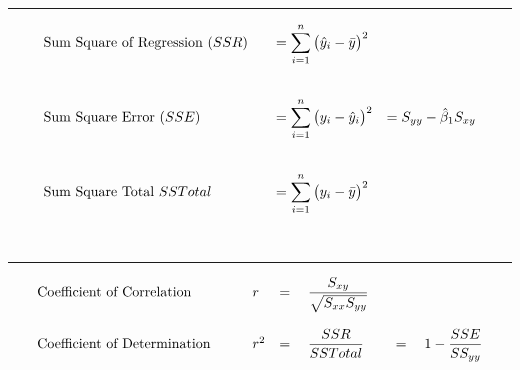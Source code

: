 \documentclass{article}
\newcommand{\HRuleLight}{\rule{\linewidth}{0.1mm}}
\begin{document}
\smallskip
\smallskip



\HRuleLight



\begin{equation*}
	\begin{array}{llll}
		\text{Sum Square of Regression }(SSR)\quad	& = \displaystyle \sum_{i=1}^{n} \big( \hat{y}_{i} - \bar{y} \big)^{2}	\\
		\hfill\\
		\hfill\\
		\text{Sum Square Error }(SSE)				& = \displaystyle \sum_{i=1}^{n} \big( y_{i} - \hat{y}_{i} \big)^{2}	
											& = S_{yy} -\hat{\beta}_{1} S_{xy} \\
		\hfill\\
		\hfill\\
		\text{Sum Square Total }SSTotal 			& = \displaystyle \sum_{i=1}^{n} \big( y_{i} - \bar{y} \big)^{2}
	\end{array}
\end{equation*}


\hfill\\
\HRuleLight
\vspace{0.25cm}


\begin{equation*}
    \begin{array}{llll}
        \text{Coefficient of Correlation}               		&   r       	& =	\quad \displaystyle\frac{ S_{xy} }{\sqrt{ S_{xx} S_{yy} } } \\
        \hfill\\
        \text{Coefficient of Determination} \quad \quad 	&   r^{2}   	& =	\quad	\displaystyle \frac{SSR}{SSTotal}	\quad\quad = \quad	1 - \displaystyle\frac{SSE}{SS_{yy}}\\
    \end{array}
\end{equation*}
\vspace{0.25cm}
\end{document}
